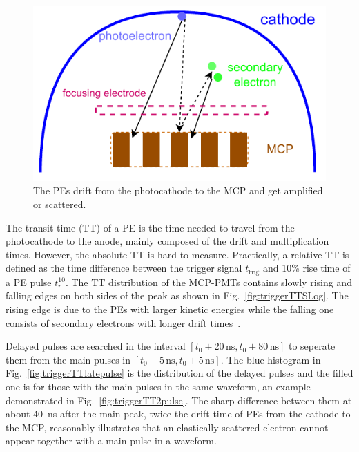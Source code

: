 \begin{figure}[!htbp]
    \centering
    \includegraphics[width=\MF\textwidth]{figures/method/MCPelectron.pdf}
    \caption{The PEs drift from the photocathode to the MCP and get amplified or scattered.}%
    \label{fig:mcpelectron}
\end{figure}

The transit time (TT) of a PE is the time needed to travel from the photocathode to the anode, mainly composed of the drift and multiplication times. However, the absolute TT is hard to measure. Practically, a relative $\mathrm{TT}$ is defined as the time difference between the trigger signal $t_{\mathrm{trig}}$ and 10\% rise time of a PE pulse $t_r^{10}$. The $\mathrm{TT}$ distribution of the MCP-PMTs contains slowly rising and falling edges on both sides of the peak as shown in Fig.~\ref{fig:triggerTTSLog}. The rising edge is due to the PEs with larger kinetic energies while the falling one consists of secondary electrons with longer drift times~\cite{longtail}.

Delayed pulses are searched in the interval $[t_0+20\,\mathrm{ns},t_0+80\,\mathrm{ns}]$ to seperate them from the main pulses in $[t_0-5\,\mathrm{ns},t_0+5\,\mathrm{ns}]$. The blue histogram in Fig.~\ref{fig:triggerTTlatepulse} is the distribution of the delayed pulses and the filled one is for those with the main pulses in the same waveform, an example demonstrated in Fig.~\ref{fig:triggerTT2pulse}. The sharp difference between them at about \SI{40}{ns} after the main peak, twice the drift time of PEs from the cathode to the MCP, reasonably illustrates that an elastically scattered electron cannot appear together with a main pulse in a waveform.

